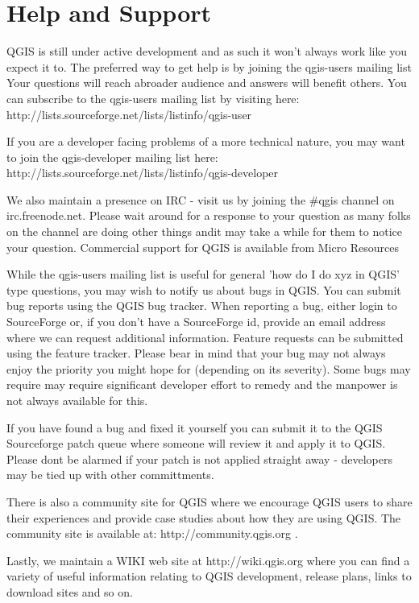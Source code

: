 \section{Help and Support}

QGIS is still under active development and as such it won't always work like you expect it to.
The preferred way to get help is by joining the qgis-users mailing list Your questions will reach abroader audience and answers will benefit others. You can subscribe to the qgis-users mailing list by visiting here: http://lists.sourceforge.net/lists/listinfo/qgis-user

If you are a developer facing problems of a more technical nature, you may want to join the qgis-developer mailing list here: http://lists.sourceforge.net/lists/listinfo/qgis-developer

We also maintain a presence on IRC - visit us by joining the #qgis channel on irc.freenode.net. Please wait around for a response to your question as many folks on the channel are doing other things andit may take a while for them to notice your question.
Commercial support for QGIS is available from Micro Resources 

While the qgis-users mailing list is useful for general 'how do I do xyz in QGIS' type questions, you may wish to notify us about bugs in QGIS. You can submit bug reports using the QGIS bug tracker. When reporting a bug, either login to SourceForge or, if you don't have a SourceForge id, provide an email address where we can request additional information.
Feature requests can be submitted using the feature tracker. Please bear in mind that your bug may not always enjoy the priority you might hope for (depending on its severity). Some bugs may require may require significant developer effort to remedy and the manpower is not always available for this.

If you have found a bug and fixed it yourself you can submit it to the QGIS Sourceforge patch queue where someone will review it and apply it to QGIS. Please dont be alarmed if your patch is not applied straight away - developers may be tied up with other committments.

There is also a community site for QGIS where we encourage QGIS users to share their experiences and provide case studies about how they are using QGIS. The community site is available at: http://community.qgis.org .

Lastly, we maintain a WIKI web site at http://wiki.qgis.org where you can find a variety of useful information relating to QGIS development, release plans, links to download sites and so on.